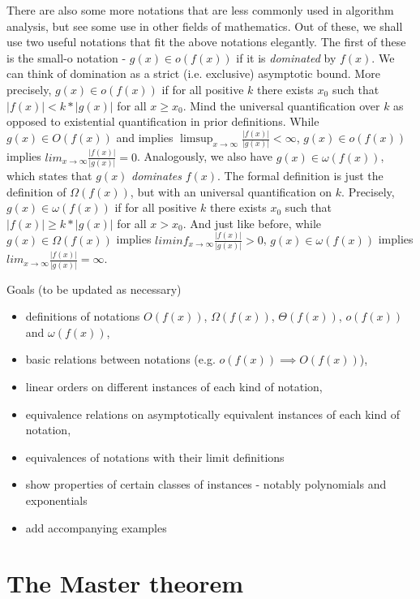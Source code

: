 There are also some more notations that are less commonly used in algorithm analysis, but see some
use in other fields of mathematics. Out of these, we shall use two useful notations that fit 
the above notations elegantly. The first of these is the small-o notation - $g(x) \in o(f(x))$
if it is \textit{dominated} by $f(x)$. We can think of domination as a strict (i.e. exclusive) 
asymptotic bound. More precisely, $g(x) \in o(f(x))$ if for all positive $k$ there exists $x_0$ 
such that $|f(x)| < k*|g(x)|$ for all $x \ge x_0$. Mind the universal quantification over $k$ as
opposed to existential quantification in prior definitions. While $g(x) \in O(f(x))$ and implies
$\limsup_{x \to \infty} \frac{|f(x)|}{|g(x)|} < \infty$, $g(x) \in o(f(x))$ implies 
$lim_{x \to \infty} \frac{|f(x)|}{|g(x)|} = 0$. Analogously, we also have $g(x) \in \omega(f(x))$,
which states that $g(x)$ \textit{dominates} $f(x)$. The formal definition is just the definition
of $\Omega(f(x))$, but with an universal quantification on $k$. Precisely, $g(x) \in \omega(f(x))$
if for all positive $k$ there exists $x_0$ such that $|f(x)| \ge k*|g(x)|$ for all $x > x_0$.
And just like before, while $g(x) \in \Omega(f(x))$ implies 
$liminf_{x \to \infty} \frac{|f(x)|}{|g(x)|} > 0$, $g(x) \in \omega(f(x))$ implies 
$lim_{x \to \infty} \frac{|f(x)|}{|g(x)|} = \infty$.

Goals (to be updated as necessary)
\begin{itemize}
\item definitions of notations $O(f(x))$, $\Omega(f(x))$, $\Theta(f(x))$, $o(f(x))$ and $\omega(f(x))$,
\item basic relations between notations (e.g. $o(f(x)) \implies O(f(x))$),
\item linear orders on different instances of each kind of notation,
\item equivalence relations on asymptotically equivalent instances of each kind of notation,
\item equivalences of notations with their limit definitions
\item show properties of certain classes of instances - notably polynomials and exponentials
\item add accompanying examples
\end{itemize}


\section{The Master theorem}

